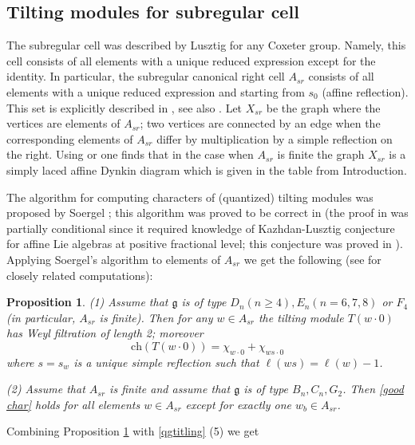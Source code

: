 \documentclass{amsart}
\newtheorem{proposition}[theorem]{Proposition}
\theoremstyle{definition}
\newcommand{\g}{\mathfrak{g}}
\numberwithin{equation}{section}
\begin{document}
\subsection{Tilting modules for subregular cell} The subregular cell was described by Lusztig \cite[3.7]{Luex}
for any Coxeter group. Namely, this cell consists of all elements with a unique reduced expression except for
the identity. In particular, the subregular canonical right cell $A_{sr}$ consists of all elements with a unique reduced
expression and starting from $s_0$ (affine reflection). This set is explicitly described in \cite[3.13]{Luex}, see
also \cite[Table 1]{Rasm}. Let $X_{sr}$ be the graph where the vertices are elements of $A_{sr}$; two
vertices are connected by an edge when the corresponding elements of $A_{sr}$ differ by multiplication
by a simple reflection on the right. Using \cite[3.13]{Luex} or \cite[Table 1]{Rasm} one finds that in the case when $A_{sr}$ is finite the graph $X_{sr}$ is a simply laced affine Dynkin diagram which is given in the table from Introduction.

The algorithm for computing characters of (quantized) tilting modules was proposed by Soergel \cite{So1};
this algorithm was proved to be correct in \cite{So2} (the proof in \cite{So2} was partially conditional since
it required knowledge of Kazhdan-Lusztig conjecture for affine Lie algebras at positive fractional level;
this conjecture was proved in \cite{KaTa}). Applying Soergel's algorithm to elements of $A_{sr}$ we get
the following (see \cite{Rasm} for closely related computations):

\begin{proposition}\label{nog2} 
(1) Assume that $\g$ is of type $D_n (n\ge 4), E_n (n=6,7,8)$ or $F_4$ (in particular,
$A_{sr}$ is finite). Then for any
$w\in A_{sr}$ the tilting module $T(w\cdot 0)$ has Weyl filtration of length 2; moreover
\begin{equation}\label{good char}
    \mbox{ch}(T(w\cdot 0))=\chi_{w\cdot 0}+\chi_{ws\cdot 0}
\end{equation}
where $s=s_w$ is a unique simple reflection such that $\ell(ws)=\ell(w)-1$.

(2) Assume that $A_{sr}$ is finite and assume that $\g$ is of type $B_n, C_n, G_2$.
Then \eqref{good char} holds for all elements $w\in A_{sr}$ except for exactly one $w_b\in A_{sr}$.
\end{proposition}  

Combining Proposition \ref{nog2} with \ref{qgtitling} (5) we get
\end{document}
